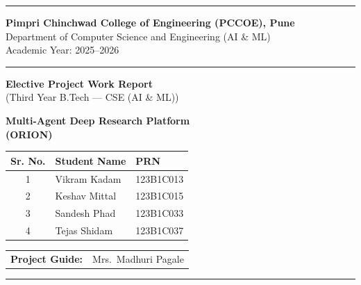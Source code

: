 \documentclass[12pt, a4paper]{article}
\begin{document}
\begin{titlepage}
    \begin{center}
        \noindent\rule{\textwidth}{2pt}
        \vspace{0.3cm}

        {\large \textbf{Pimpri Chinchwad College of Engineering (PCCOE), Pune}}\\
        \vspace{0.1cm}
        {\normalsize Department of Computer Science and Engineering (AI \& ML)}\\
        \vspace{0.1cm}
        {\normalsize Academic Year: 2025--2026}

        \vspace{0.2cm}
        \noindent\rule{\textwidth}{1pt}
        \vspace{1.2cm}

        {\Large \textbf{Elective Project Work Report}}\\
        \vspace{0.3cm}
        {\small (Third Year B.Tech --- CSE (AI \& ML))}

        \vspace{1.4cm}

        \begin{mdframed}[linewidth=1.5pt, innertopmargin=12pt, innerbottommargin=12pt]
            \centering
            \LARGE \textbf{Multi-Agent Deep Research Platform}\\[6pt]
            \Large \textbf{(ORION)}
        \end{mdframed}

        \vspace{1.6cm}

        \renewcommand{\arraystretch}{1.4}
        \begin{tabular}{|c|l|l|}
            \hline
            \textbf{Sr. No.} & \textbf{Student Name} & \textbf{PRN} \\
            \hline
            1 & Vikram Kadam   & 123B1C013 \\
            2 & Keshav Mittal  & 123B1C015 \\
            3 & Sandesh Phad   & 123B1C033 \\
            4 & Tejas Shidam   & 123B1C037 \\
            \hline
        \end{tabular}

        \vspace{1.5cm}

        \begin{tabular}{ll}
            \textbf{Project Guide:} & Mrs.\ Madhuri Pagale \\
        \end{tabular}

        \vfill
        \noindent\rule{\textwidth}{2pt}
    \end{center}
\end{titlepage}
\end{document}
